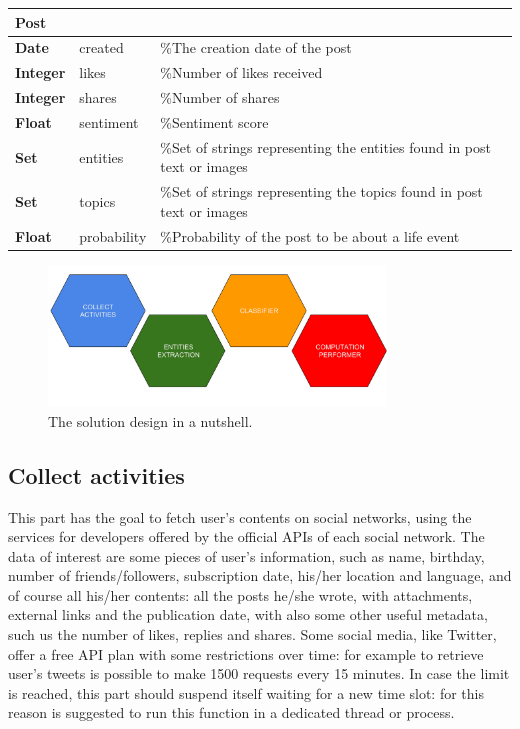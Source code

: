 \begin{center}
\label{tab:post}
\begin{tabular}{lll}
\hline
Post & & \\
\hline
\textbf{Date} & created & \%The creation date of the post \\
\textbf{Integer} & likes & \%Number of likes received \\
\textbf{Integer} & shares & \%Number of shares \\
\textbf{Float} & sentiment & \%Sentiment score \\
\textbf{Set} & entities & \%Set of strings representing the entities found in post text or images \\
\textbf{Set} & topics & \%Set of strings representing the topics found in post text or images \\
\textbf{Float} & probability & \%Probability of the post to be about a life event \\
\hline
\end{tabular}
\end{center}


\begin{figure}
\centering
\includegraphics[width=%
0.8\textwidth]{img/Solutiondesign_nutshell}
\caption{The solution design in a nutshell.}
\label{fig:nutshell}
\end{figure}

\subsection{Collect activities}
This part has the goal to fetch user's contents on social networks, using the services for developers offered by the official APIs of each social network. The data of interest are some pieces of user's information, such as name, birthday, number of friends/followers, subscription date, his/her location and language, and of course all his/her contents: all the posts he/she wrote, with attachments, external links and the publication date, with also some other useful metadata, such us the number of likes, replies and shares. Some social media, like Twitter, offer a free API plan with some restrictions over time: for example to retrieve user's tweets is possible to make 1500 requests every 15 minutes. In case the limit is reached, this part should suspend itself waiting for a new time slot: for this reason is suggested to run this function in a dedicated thread or process.

